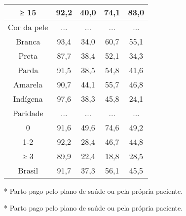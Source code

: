 \documentclass{article}
\begin{document}
\begin{table}
\begin{tabulary}{\linewidth}{ C C C C C }
≥ 15
& 92,2
& 40,0
& 74,1
& 83,0
\\ \hline

Cor da pele
& ...
& ...
& ...
& ...
\\ \hline

Branca
& 93,4
& 34,0
& 60,7
& 55,1
\\ \hline

Preta
& 87,7
& 38,4
& 52,1
& 34,3
\\ \hline

Parda
& 91,5
& 38,5
& 54,8
& 41,6
\\ \hline

Amarela
& 90,7
& 44,1
& 55,7
& 46,8
\\ \hline

Indígena
& 97,6
& 38,3
& 45,8
& 24,1
\\ \hline

Paridade
& ...
& ...
& ...
& ...
\\ \hline

0
& 91,6
& 49,6
& 74,6
& 49,2
\\ \hline

1-2
& 92,2
& 28,4
& 46,7
& 44,8
\\ \hline

≥ 3
& 89,9
& 22,4
& 18,8
& 28,5
\\ \hline

Brasil
& 91,7
& 37,3
& 56,1
& 45,5
\\ \hline

\end{tabulary}
\caption*{\footnotesize }
\caption{}
\end{table}

* Parto pago pelo plano de saúde ou pela própria paciente.

* Parto pago pelo plano de saúde ou pela própria paciente.
\end{document}
